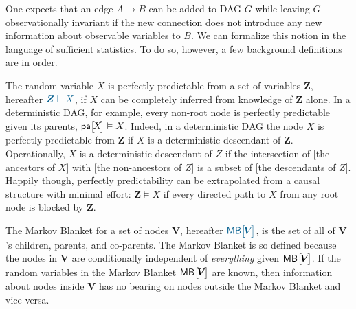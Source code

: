 

One expects that an edge $A\to B$ can be added to DAG $G$ while leaving $G$ observationally invariant if the new connection does not introduce any new information about observable variables to $B$. %
We can formalize this notion in the language of sufficient statistics. To do so, however, a few background definitions are in order.

 The random variable $X$ is perfectly predictable from a set of variables $\bm{Z}$, hereafter $\mblue{\bm{Z}\vDash X}$, if $X$ can be completely inferred from knowledge of $\bm{Z}$ alone. In a deterministic DAG, for example, every non-root node is perfectly predictable given its parents, ${\NamedFunction{pa}{\!X\!}\vDash X}$. Indeed, in a deterministic DAG the node $X$ is perfectly predictable from $\bm{Z}$ if $X$ is a deterministic descendant of $\bm{Z}$. Operationally, $X$ is a deterministic descendant of $Z$ if the intersection of {[the ancestors of $X$]} with {[the non-ancestors of $Z$]} is a subset of {[the descendants of $Z$]}. Happily though, perfectly predictability can be extrapolated from a causal structure with minimal effort: ${\bm{Z}\vDash X}$ if every directed path to $X$ from any root node is blocked by $\bm{Z}$. 

 The Markov Blanket for a set of nodes $\bm{V}$, hereafter $\mblue{\NamedFunction{MB}{\!\bm{V}\!}}$, is the set of all of $\bm{V}$'s children, parents, and co-parents. The Markov Blanket is so defined because the nodes in $\bm{V}$ are conditionally independent of \emph{everything} given $\NamedFunction{MB}{\!\bm{V}\!}$. If the random variables in the Markov Blanket $\NamedFunction{MB}{\!\bm{V}\!}$ are known, then information about nodes inside $\bm{V}$ has no bearing on nodes outside the Markov Blanket and vice versa.

